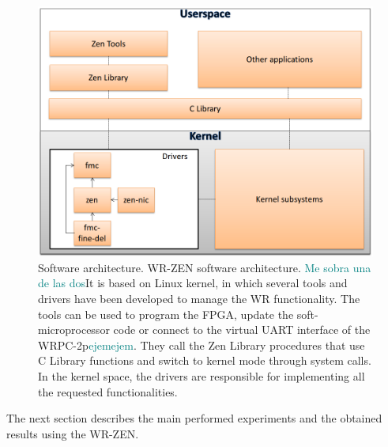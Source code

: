 \begin{figure}[H] \centering
	\includegraphics[scale=0.4]{img/software_architecture}
	\caption{Software architecture. WR-ZEN software
	architecture. \textcolor{teal}{Me sobra una de las dos}It is based on Linux 
	kernel, in which
	several tools and drivers have been developed to manage the WR functionality. The
	tools can be used to program the FPGA, update the soft-microprocessor
	code or connect to the virtual UART interface of the 
	WRPC-2p\textcolor{teal}{ejemejem}. They call
	the Zen Library procedures that use C Library functions and
	switch to kernel mode through system calls. In the kernel space, the
drivers are responsible for implementing all the requested functionalities. }
\label{fig:software_architecture} \end{figure}

The next section describes the main performed experiments and the obtained
results using the WR-ZEN.

